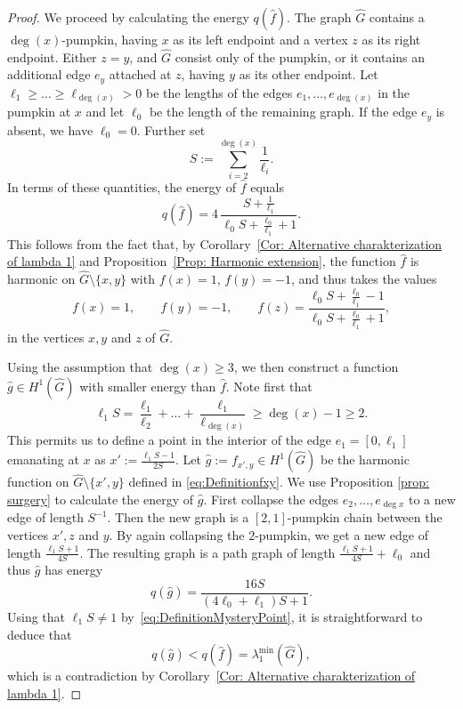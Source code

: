 \documentclass[10pt,a4paper]{amsart}
\begin{document}
\begin{proof}
	We proceed by calculating the energy $q(\widehat{f})$. The graph $\widehat{G}$ contains a $\deg(x)$-pumpkin, having $x$ as its left endpoint and a vertex $z$ as its right endpoint. Either $z=y$, and $\widehat G$ consist only of the pumpkin, or it contains an additional edge $e_y$ attached at $z$, having $y$ as its other endpoint. Let $\ell_1\geq \dots\geq \ell_{\deg (x)} >0$ be the lengths of the edges $e_1, \dots, e_{\deg(x)}$ in the pumpkin at $x$ and let $\ell_0$ be the length of the remaining graph. If the edge $e_y$ is absent, we have $\ell_0 = 0$. Further set
	\[
	S := \sum_{i=2}^{\deg(x)} \frac{1}{\ell_i}.
	\]
	In terms of these quantities, the energy of $\widehat f$ equals
	\[
	q(\widehat{f}) =  4 \, \frac{S + \frac{1}{\ell_1}}{\ell_0S + \frac{\ell_0}{\ell_1} +1}.
	\] 
	This follows from the fact that, by Corollary~\ref{Cor: Alternative charakterization of lambda 1} and Proposition~\ref{Prop: Harmonic extension}, the function $\widehat f$ is harmonic on $\widehat G\setminus \{x,y\}$ with $f(x) = 1$, $f(y) =-1$, and thus takes the values
	\[
	f(x) = 1, \qquad f(y) = - 1, \qquad  f(z) = \frac{\ell_0 S+ \frac{\ell_0}{\ell_1} - 1}{\ell_0 S + \frac{\ell_0}{\ell_1} +1},
	\]
	in the vertices $x,y$ and $z$ of $\widehat G$. 
	
	Using the assumption that $\deg(x) \ge 3$, we then construct a function $\widehat g \in H^1(\widehat G)$ with smaller energy than $\widehat f$. Note first that
	\begin{equation} \label{eq:DefinitionMysteryPoint}
		\ell_1S = \frac{\ell_1}{\ell_2} + \dots + \frac{\ell_1}{\ell_{\deg(x)}} \geq \deg(x) -1 \geq 2. 
	\end{equation}
	This permits us to define a point in the interior of the edge $e_1=[0, \ell_1]$ emanating at $x$ as $x' := \frac{\ell_1S  -1}{2S}$. 
	Let $\widehat g := f_{x', y} \in H^1(\widehat G)$ be the harmonic function on $\widehat G \setminus \{x',y\}$ defined in \eqref{eq:Definitionfxy}. We use Proposition \ref{prop: surgery} to calculate the energy of $\widehat{g}$. First collapse the edges $e_2, \dots, e_{\deg x}$ to a new edge of length $S^{-1}$. Then the new graph is a $[2,1]$-pumpkin chain between the vertices $x', z$ and $y$. By again collapsing the $2$-pumpkin, we get a new edge of length $\frac{\ell_1S+1}{4S}$. The resulting graph is a path graph of length $\frac{\ell_1S+1}{4S}+\ell_0$ and thus $\widehat g$ has energy
	\[
	q(\widehat g) = \frac{16S}{(4\ell_0 + \ell_1)S +1}.
	\]
	Using that $\ell_1 S \neq 1$ by~\eqref{eq:DefinitionMysteryPoint}, it is straightforward to deduce that
	\[
	q(\widehat g) <  q(\widehat f) =  \lambda_{1}^{\min}(\widehat{G}),
	\]
	which is a contradiction by Corollary~\ref{Cor: Alternative charakterization of lambda 1}.
\end{proof}
\end{document}
